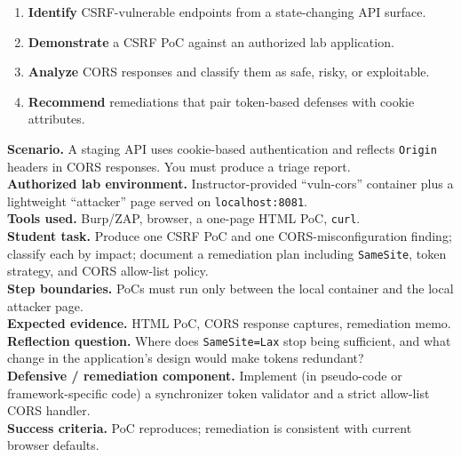 \documentclass[11pt,letterpaper,oneside]{report}
\newcommand{\tool}[1]{\texttt{\small #1}}
\begin{document}
\begin{outcomes}
\begin{enumerate}
  \item \textbf{Identify} CSRF-vulnerable endpoints from a state-changing API surface.
  \item \textbf{Demonstrate} a CSRF PoC against an authorized lab application.
  \item \textbf{Analyze} CORS responses and classify them as safe, risky, or exploitable.
  \item \textbf{Recommend} remediations that pair token-based defenses with cookie attributes.
\end{enumerate}
\end{outcomes}

\begin{labbox}
\textbf{Scenario.} A staging API uses cookie-based authentication and reflects \tool{Origin} headers in CORS responses. You must produce a triage report.\\[3pt]
\textbf{Authorized lab environment.} Instructor-provided ``vuln-cors'' container plus a lightweight ``attacker'' page served on \tool{localhost:8081}.\\[3pt]
\textbf{Tools used.} Burp/ZAP, browser, a one-page HTML PoC, \tool{curl}.\\[3pt]
\textbf{Student task.} Produce one CSRF PoC and one CORS-misconfiguration finding; classify each by impact; document a remediation plan including \tool{SameSite}, token strategy, and CORS allow-list policy.\\[3pt]
\textbf{Step boundaries.} PoCs must run only between the local container and the local attacker page.\\[3pt]
\textbf{Expected evidence.} HTML PoC, CORS response captures, remediation memo.\\[3pt]
\textbf{Reflection question.} Where does \tool{SameSite=Lax} stop being sufficient, and what change in the application's design would make tokens redundant?\\[3pt]
\textbf{Defensive / remediation component.} Implement (in pseudo-code or framework-specific code) a synchronizer token validator and a strict allow-list CORS handler.\\[3pt]
\textbf{Success criteria.} PoC reproduces; remediation is consistent with current browser defaults.
\end{labbox}

\end{document}

